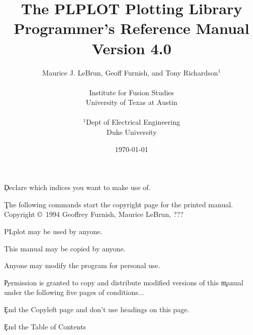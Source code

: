 %
%
%
%

\pagestyle{headings}



\c Declare which indices you want to make use of.

\title{ The PLPLOT Plotting Library \\ 
        Programmer's Reference Manual \\
        Version 4.0}
\author{
        Maurice J. LeBrun, 
        Geoff Furnish, and
        Tony Richardson$^1$\\
\\
        Institute for Fusion Studies\\
        University of Texas at Austin\\
        \\
        $^1$Dept of Electrical Engineering\\
        Duke University\\
        }

\date{\today}
\maketitle

\c The following commands start the copyright page for the printed manual.
\clearpage
\vspace{0pt plus 1filll}
Copyright \copyright\ 1994 Geoffrey Furnish, Maurice LeBrun, ???

PLplot may be used by anyone.

This manual may be copied by anyone.

Anyone may modify the program for personal use.

\c Permission is granted to copy and distribute modified versions of this
\c manual under the following five pages of conditions...

\c End the Copyleft page and don't use headings on this page.
\clearpage
\pagestyle{headings}

\tableofcontents

\c End the Table of Contents
\clearpage
{}


